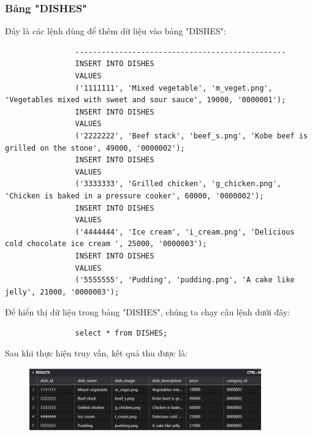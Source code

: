 \documentclass[13pt,a4paper]{article}
\begin{document}
			\subsubsection{Bảng "DISHES"}
			Đây là các lệnh dùng để thêm dữ liệu vào bảng "DISHES":
			\begin{lstlisting}							
				------------------------------------------------
				INSERT INTO DISHES
				VALUES
				('1111111', 'Mixed vegetable', 'm_veget.png', 'Vegetables mixed with sweet and sour sauce', 19000, '0000001');
				INSERT INTO DISHES
				VALUES
				('2222222', 'Beef stack', 'beef_s.png', 'Kobe beef is grilled on the stone', 49000, '0000002');
				INSERT INTO DISHES
				VALUES
				('3333333', 'Grilled chicken', 'g_chicken.png', 'Chicken is baked in a pressure cooker', 60000, '0000002');
				INSERT INTO DISHES
				VALUES
				('4444444', 'Ice cream', 'i_cream.png', 'Delicious cold chocolate ice cream ', 25000, '0000003');
				INSERT INTO DISHES
				VALUES
				('5555555', 'Pudding', 'pudding.png', 'A cake like jelly', 21000, '0000003');				
			\end{lstlisting}
			Để hiển thị dữ liệu trong bảng "DISHES", chúng ta chạy câu lệnh dưới đây:
			\begin{lstlisting}
				select * from DISHES;
			\end{lstlisting}
			Sau khi thực hiện truy vấn, kết quả thu được là:
			\begin{figure}[h!]
				\begin{center}
					\includegraphics[width=10cm]{vitran/insert_dishes.png}
				\end{center}
			\end{figure}
			
\end{document}
